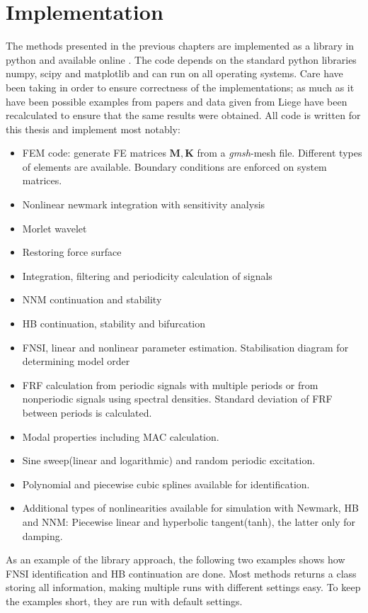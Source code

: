 
\chapter{Implementation}
\label{cha:implementation}


The methods presented in the previous chapters are implemented as a library in
python and available online \autocite{paw2017}. The code depends on the standard
python libraries numpy, scipy and matplotlib and can run on all operating
systems. Care have been taking in order to ensure correctness of the
implementations; as much as it have been possible examples from papers and data given
from Liege have been recalculated to ensure that the same results were obtained.
All code is written for this thesis and implement most notably:
\begin{itemize}
\item FEM code: generate FE matrices $\bm M, \bm K$ from a \textit{gmsh}-mesh
  file. Different types of elements are available. Boundary conditions are
  enforced on system matrices.
\item Nonlinear newmark integration with sensitivity analysis
\item Morlet wavelet
\item Restoring force surface
\item Integration, filtering and periodicity calculation of signals
\item NNM continuation and stability
\item HB continuation, stability and bifurcation
\item FNSI, linear and nonlinear parameter estimation. Stabilisation diagram
  for determining model order
\item FRF calculation from periodic signals with multiple periods or from
  nonperiodic signals using spectral densities. Standard deviation of FRF
  between periods is calculated.
\item Modal properties including MAC calculation.
\item Sine sweep(linear and logarithmic) and random periodic excitation.
\item Polynomial and piecewise cubic splines available for identification.
\item Additional types of nonlinearities available for simulation with Newmark,
  HB and NNM: Piecewise linear and hyperbolic tangent(tanh), the latter only for
  damping.
\end{itemize}

As an example of the library approach, the following two examples shows how FNSI
identification and HB continuation are done. Most methods returns a class
storing all information, making multiple runs with different settings easy. To
keep the examples short, they are run with default settings.

